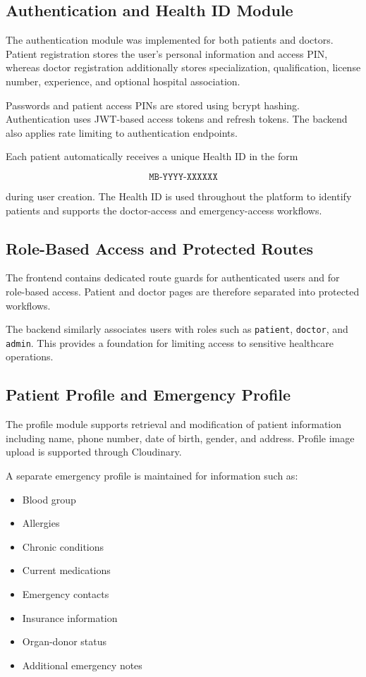 \documentclass{tietreport}
\begin{document}
\subsection{Authentication and Health ID Module}

The authentication module was implemented for both patients and doctors.
Patient registration stores the user's personal information and access
PIN, whereas doctor registration additionally stores specialization,
qualification, license number, experience, and optional hospital
association.

Passwords and patient access PINs are stored using bcrypt hashing.
Authentication uses JWT-based access tokens and refresh tokens. The
backend also applies rate limiting to authentication endpoints.

Each patient automatically receives a unique Health ID in the form

\[
\texttt{MB-YYYY-XXXXXX}
\]

during user creation. The Health ID is used throughout the platform to
identify patients and supports the doctor-access and emergency-access
workflows.

\subsection{Role-Based Access and Protected Routes}

The frontend contains dedicated route guards for authenticated users and
for role-based access. Patient and doctor pages are therefore separated
into protected workflows.

The backend similarly associates users with roles such as
\texttt{patient}, \texttt{doctor}, and \texttt{admin}. This provides a
foundation for limiting access to sensitive healthcare operations.

\subsection{Patient Profile and Emergency Profile}

The profile module supports retrieval and modification of patient
information including name, phone number, date of birth, gender, and
address. Profile image upload is supported through Cloudinary.

A separate emergency profile is maintained for information such as:

\begin{itemize}
  \item Blood group
  \item Allergies
  \item Chronic conditions
  \item Current medications
  \item Emergency contacts
  \item Insurance information
  \item Organ-donor status
  \item Additional emergency notes
\end{itemize}
\end{document}
